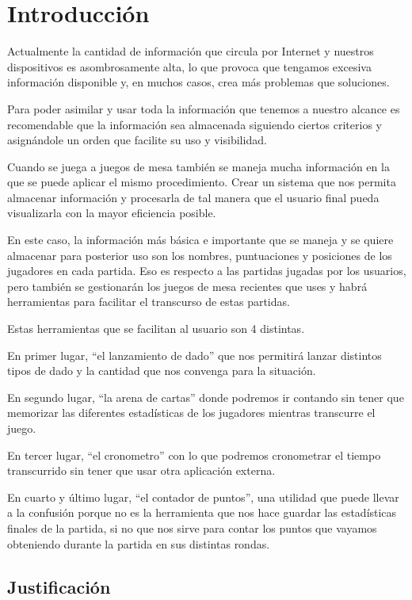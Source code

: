 \chapter{Introducción}\label{cap:introduccion}

Actualmente la cantidad de información que circula por Internet y nuestros dispositivos es asombrosamente alta, lo que provoca que tengamos excesiva información disponible y, en muchos casos, crea más problemas que soluciones.

Para poder asimilar y usar toda la información que tenemos a nuestro alcance es recomendable que la información sea almacenada siguiendo ciertos criterios y asignándole un orden que facilite su uso y visibilidad.

Cuando se juega a juegos de mesa también se maneja mucha información en la que se puede aplicar el mismo procedimiento. Crear un sistema que nos permita almacenar información y procesarla de tal manera que el usuario final pueda visualizarla con la mayor eficiencia posible.

En este caso, la información más básica e importante que se maneja y se quiere almacenar para posterior uso son los nombres, puntuaciones y posiciones de los jugadores en cada partida. Eso es respecto a las partidas jugadas por los usuarios, pero también se gestionarán los juegos de mesa recientes que uses y habrá herramientas para facilitar el transcurso de estas partidas.

Estas herramientas que se facilitan al usuario son 4 distintas.

En primer lugar, “el lanzamiento de dado” que nos permitirá lanzar distintos tipos de dado y la cantidad que nos convenga para la situación.

En segundo lugar, “la arena de cartas” donde podremos ir contando sin tener que memorizar las diferentes estadísticas de los jugadores mientras transcurre el juego.

En tercer lugar, “el cronometro” con lo que podremos cronometrar el tiempo transcurrido sin tener que usar otra aplicación externa.

En cuarto y último lugar, “el contador de puntos”, una utilidad que puede llevar a la confusión porque no es la herramienta que nos hace guardar las estadísticas finales de la partida, si no que nos sirve para contar los puntos que vayamos obteniendo durante la partida en sus distintas rondas.

\newpage

\section{Justificación}


